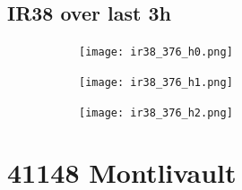 \documentclass{article}
\begin{document}
\vspace{-1em}
\subsection*{IR38 over last 3h}
\vspace{-1em}
\begin{figure}[H]
    \centering
    \begin{subfigure}[b]{0.32\textwidth}
        \centering
        \texttt{[image: ir38\_376\_h0.png]} %
    \end{subfigure}
    \begin{subfigure}[b]{0.32\textwidth}
        \centering
        \texttt{[image: ir38\_376\_h1.png]} %
    \end{subfigure}
    \begin{subfigure}[b]{0.32\textwidth}
        \centering
        \texttt{[image: ir38\_376\_h2.png]} %
    \end{subfigure}
\end{figure}

\vspace{-1em}
\section*{41148 Montlivault}
\vspace{-1em}
\end{document}
